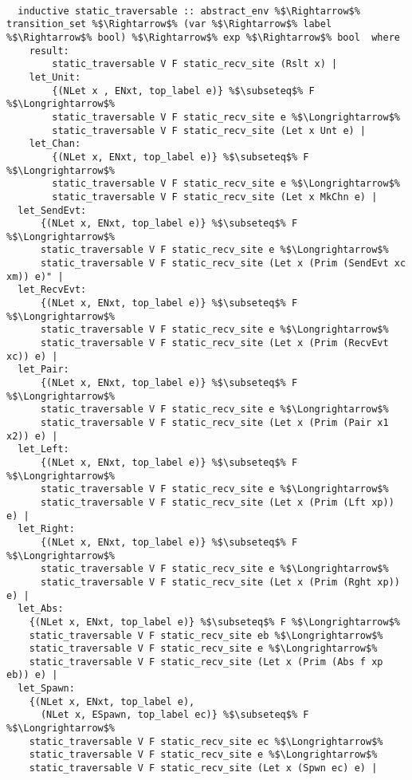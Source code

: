 \documentclass{article}
\begin{document}
\begin{lstlisting}[style=codestyle1, escapechar=\%]

  inductive static_traversable :: abstract_env %$\Rightarrow$% transition_set %$\Rightarrow$% (var %$\Rightarrow$% label %$\Rightarrow$% bool) %$\Rightarrow$% exp %$\Rightarrow$% bool  where
    result:
        static_traversable V F static_recv_site (Rslt x) |
    let_Unit:
        {(NLet x , ENxt, top_label e)} %$\subseteq$% F %$\Longrightarrow$%
        static_traversable V F static_recv_site e %$\Longrightarrow$%
        static_traversable V F static_recv_site (Let x Unt e) |
    let_Chan:
        {(NLet x, ENxt, top_label e)} %$\subseteq$% F %$\Longrightarrow$%
        static_traversable V F static_recv_site e %$\Longrightarrow$%
        static_traversable V F static_recv_site (Let x MkChn e) |
  let_SendEvt:
      {(NLet x, ENxt, top_label e)} %$\subseteq$% F %$\Longrightarrow$%
      static_traversable V F static_recv_site e %$\Longrightarrow$%
      static_traversable V F static_recv_site (Let x (Prim (SendEvt xc xm)) e)" |
  let_RecvEvt:
      {(NLet x, ENxt, top_label e)} %$\subseteq$% F %$\Longrightarrow$%
      static_traversable V F static_recv_site e %$\Longrightarrow$%
      static_traversable V F static_recv_site (Let x (Prim (RecvEvt xc)) e) |
  let_Pair:
      {(NLet x, ENxt, top_label e)} %$\subseteq$% F %$\Longrightarrow$%
      static_traversable V F static_recv_site e %$\Longrightarrow$%
      static_traversable V F static_recv_site (Let x (Prim (Pair x1 x2)) e) |
  let_Left:
      {(NLet x, ENxt, top_label e)} %$\subseteq$% F %$\Longrightarrow$%
      static_traversable V F static_recv_site e %$\Longrightarrow$%
      static_traversable V F static_recv_site (Let x (Prim (Lft xp)) e) |
  let_Right:
      {(NLet x, ENxt, top_label e)} %$\subseteq$% F %$\Longrightarrow$%
      static_traversable V F static_recv_site e %$\Longrightarrow$%
      static_traversable V F static_recv_site (Let x (Prim (Rght xp)) e) |
  let_Abs:
    {(NLet x, ENxt, top_label e)} %$\subseteq$% F %$\Longrightarrow$%
    static_traversable V F static_recv_site eb %$\Longrightarrow$%
    static_traversable V F static_recv_site e %$\Longrightarrow$%
    static_traversable V F static_recv_site (Let x (Prim (Abs f xp eb)) e) |
  let_Spawn:
    {(NLet x, ENxt, top_label e),
      (NLet x, ESpawn, top_label ec)} %$\subseteq$% F %$\Longrightarrow$%
    static_traversable V F static_recv_site ec %$\Longrightarrow$%
    static_traversable V F static_recv_site e %$\Longrightarrow$%
    static_traversable V F static_recv_site (Let x (Spwn ec) e) |

\end{lstlisting}
\end{document}
